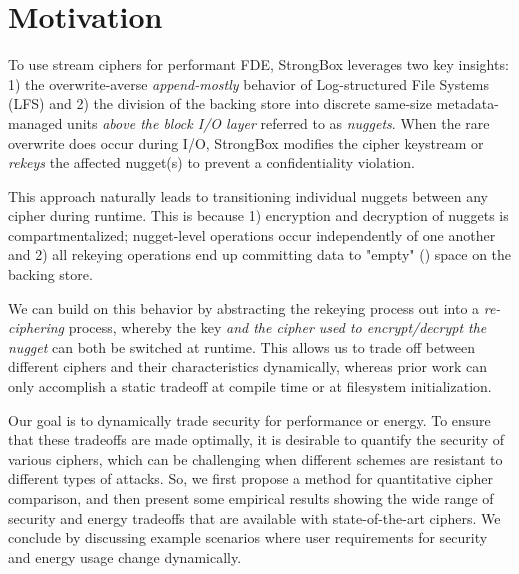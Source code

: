 \section{Motivation}\label{sec:motivation}

To use stream ciphers for performant FDE, StrongBox leverages two key insights:
1) the overwrite-averse \emph{append-mostly} behavior of Log-structured File
Systems (LFS) and 2) the division of the backing store into discrete same-size
metadata-managed units \emph{above the block I/O layer} referred to as
\emph{nuggets}. When the rare overwrite does occur during I/O, StrongBox
modifies the cipher keystream or \emph{rekeys} the affected nugget(s) to prevent
a confidentiality violation.

This approach naturally leads to transitioning individual nuggets between any
cipher during runtime. This is because 1) encryption and decryption of nuggets
is compartmentalized; nugget-level operations occur independently of one another
and 2) all rekeying operations end up committing data to "empty"
() space on the backing store.

We can build on this behavior by abstracting the rekeying process out into a
\emph{re-ciphering} process, whereby the key \emph{and the cipher used to
encrypt/decrypt the nugget} can both be switched at runtime. This allows us to
trade off between different ciphers and their characteristics dynamically,
whereas prior work can only accomplish a static tradeoff at compile time or
at filesystem initialization.

Our goal is to dynamically trade security for performance or energy.  To ensure that these tradeoffs are made optimally, it is desirable to quantify the security of various ciphers, which can be challenging when different schemes are resistant to different types of attacks. So, we first propose a method for quantitative cipher comparison, and then present some empirical results showing the wide range of security and energy tradeoffs that are available with state-of-the-art ciphers.  We conclude by discussing example scenarios where user requirements for security and energy usage change dynamically.


